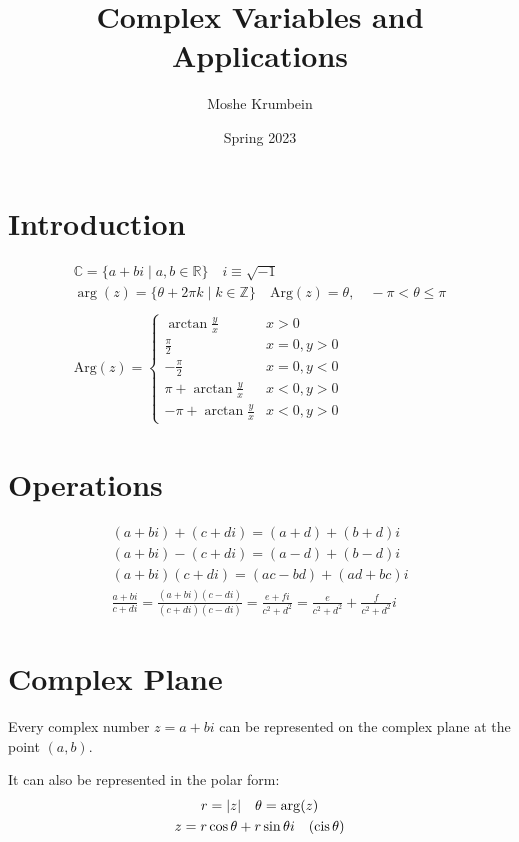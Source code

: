 \documentclass[00_complete]{subfiles}
\title{Complex Variables and Applications}
\author{Moshe Krumbein}
\date{Spring 2023}
\begin{document}
\section{Introduction}
\begin{gather*}
    \mathbb{C}= \{a+bi \mid a,b \in \mathbb{R}\} \quad i \equiv \sqrt{-1} \\ 
    \arg(z)=\{\theta + 2\pi k\mid k\in \mathbb{Z}\} \quad \mathrm{Arg}(z)=\theta,
    \quad -\pi < \theta \leq \pi \\ \\ 
    \mathrm{Arg}(z) =\begin{cases}
        \arctan{\frac{y}{x}} & x > 0 \\ 
        \frac{\pi}{2} & x=0, y> 0 \\ 
        -\frac{\pi}{2} & x=0, y<0 \\ 
         \pi +\arctan{\frac{y}{x}} & x < 0, y > 0 \\ 
        -\pi+ \arctan{\frac{y}{x}} & x < 0, y > 0
    \end{cases}
\end{gather*}
\section{Operations}

\begin{gather}
    (a+bi)+(c+di) = (a+d)+(b+d)i \\
    (a+bi)-(c+di) = (a-d)+(b-d)i \\
    (a+bi)(c+di) = (ac - bd) + (ad + bc)i \\
    \frac{a+bi}{c+di} = \frac{(a+bi)(c-di)}{(c+di)(c-di)}
    = \frac{e+fi}{c^2+d^2} = \frac{e}{c^2+d^2}+\frac{f}{c^2+d^2}i
\end{gather}

\section{Complex Plane}

Every complex number \(z=a+bi\) can be represented on the complex plane
at the point \((a,b)\).

It can also be represented in the polar form: \[
\begin{gathered}
    r=|z| \quad \theta = \arg(z) \\
    z = r \cos \theta + r \sin \theta i \quad (\operatorname{cis} \theta)\\
\end{gathered}
\]
\end{document}
